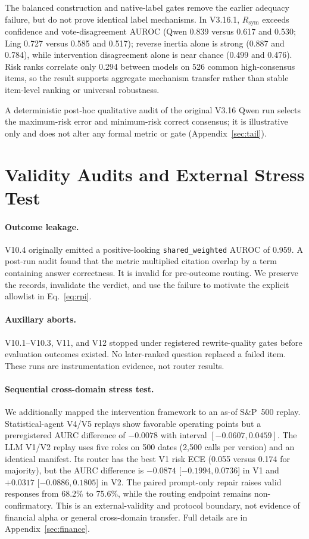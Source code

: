 \documentclass[11pt]{article}
\begin{document}
The balanced construction and native-label gates remove the earlier adequacy failure, but do not prove identical label mechanisms. In V3.16.1, $R_{\mathrm{sym}}$ exceeds confidence and vote-disagreement AUROC (Qwen 0.839 versus 0.617 and 0.530; Ling 0.727 versus 0.585 and 0.517); reverse inertia alone is strong (0.887 and 0.784), while intervention disagreement alone is near chance (0.499 and 0.476). Risk ranks correlate only 0.294 between models on 526 common high-consensus items, so the result supports aggregate mechanism transfer rather than stable item-level ranking or universal robustness.

A deterministic post-hoc qualitative audit of the original V3.16 Qwen run selects the maximum-risk error and minimum-risk correct consensus; it is illustrative only and does not alter any formal metric or gate (Appendix~\ref{sec:tail}).

\section{Validity Audits and External Stress Test}

\paragraph{Outcome leakage.}
V10.4 originally emitted a positive-looking \texttt{shared\_weighted} AUROC of 0.959. A post-run audit found that the metric multiplied citation overlap by a term containing answer correctness. It is invalid for pre-outcome routing. We preserve the records, invalidate the verdict, and use the failure to motivate the explicit allowlist in Eq.~\ref{eq:rpi}.

\paragraph{Auxiliary aborts.}
V10.1--V10.3, V11, and V12 stopped under registered rewrite-quality gates before evaluation outcomes existed. No later-ranked question replaced a failed item. These runs are instrumentation evidence, not router results.

\paragraph{Sequential cross-domain stress test.}
We additionally mapped the intervention framework to an as-of S\&P~500 replay. Statistical-agent V4/V5 replays show favorable operating points but a preregistered AURC difference of $-0.0078$ with interval $[-0.0607,0.0459]$. The LLM V1/V2 replay uses five roles on 500 dates (2,500 calls per version) and an identical manifest. Its router has the best V1 risk ECE (0.055 versus 0.174 for majority), but the AURC difference is $-0.0874$ [\(-0.1994,0.0736\)] in V1 and $+0.0317$ [\(-0.0886,0.1805\)] in V2. The paired prompt-only repair raises valid responses from 68.2\% to 75.6\%, while the routing endpoint remains non-confirmatory. This is an external-validity and protocol boundary, not evidence of financial alpha or general cross-domain transfer. Full details are in Appendix~\ref{sec:finance}.
\end{document}
